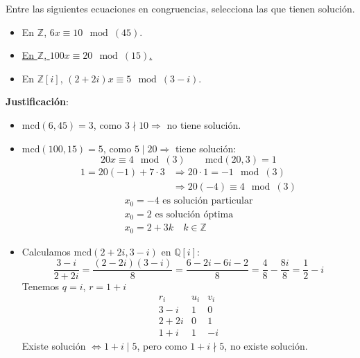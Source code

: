 \begin{ejercicio}
    Entre las siguientes ecuaciones en congruencias, selecciona las que tienen solución.
    \begin{itemize}
        \item En $\mathbb{Z}$, $6x\equiv 10 \mod (45)$.
        \item \underline{En $\mathbb{Z}$, $100x\equiv 20\mod (15)$.}
        \item En $\mathbb{Z}[i]$, $(2+2i)x\equiv 5\mod(3-i)$.
    \end{itemize}

    \noindent
    \textbf{Justificación}:
    \begin{itemize}
        \item $\text{mcd}(6,45)=3$, como $3\nmid 10 \Longrightarrow$ no tiene solución.
        \item $\text{mcd}(100,15)=5$, como $5\mid 20 \Longrightarrow $ tiene solución:
            \begin{equation*}
                20x\equiv 4\mod (3) \qquad \text{mcd}(20,3)=1
            \end{equation*}
            \begin{align*}
                1 = 20(-1)+7\cdot 3 &\Longrightarrow 20\cdot 1=-1\mod (3) \\
                                    &\Longrightarrow 20(-4)\equiv 4\mod (3)
            \end{align*}
            \begin{gather*}
                x_0 = -4 \text{\ es\ solución\ particular} \\
                x_0 = 2 \text{\ es\ solución\ óptima} \\
                x_0 = 2+3k\quad k\in \mathbb{Z}
            \end{gather*}
        \item Calculamos $\text{mcd}(2+2i, 3-i)$ en $\mathbb{Q}[i]$:
            \begin{equation*}
                \dfrac{3-i}{2+2i} = \dfrac{(2-2i)(3-i)}{8} = \dfrac{6-2i-6i-2}{8}=\dfrac{4}{8}-\dfrac{8i}{8} = \dfrac{1}{2}-i
            \end{equation*}
            Tenemos $q=i$, $r = 1+i$
            \begin{equation*}
                \begin{array}{rcl}
                    r_i & u_i & v_i \\
                    3-i & 1 & 0 \\
                    2+2i & 0 & 1 \\
                    1+i & 1 & -i 
                \end{array}
            \end{equation*}
            Existe solución $\Longleftrightarrow 1+i\mid 5$, pero como $1+i\nmid 5$, no existe solución.
    \end{itemize}
\end{ejercicio}

